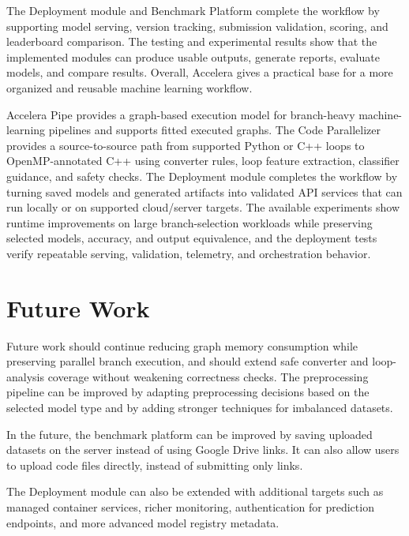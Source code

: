 \documentclass[12pt,a4paper]{report}
\begin{document}
\noindent The Deployment module and Benchmark Platform complete the workflow by
supporting model serving, version tracking, submission validation, scoring, and
leaderboard comparison. The testing and experimental results show that the
implemented modules can produce usable outputs, generate reports, evaluate
models, and compare results. Overall, Accelera gives a practical base for a
more organized and reusable machine learning workflow.

\noindent Accelera Pipe provides a graph-based execution model for branch-heavy
machine-learning pipelines and supports fitted executed graphs. The Code
Parallelizer provides a source-to-source path from supported Python or C++
loops to OpenMP-annotated C++ using converter rules, loop feature extraction,
classifier guidance, and safety checks. The Deployment module completes the
workflow by turning saved models and generated artifacts into validated API
services that can run locally or on supported cloud/server targets. The
available experiments show runtime improvements on large branch-selection
workloads while preserving selected models, accuracy, and output equivalence,
and the deployment tests verify repeatable serving, validation, telemetry, and
orchestration behavior.

\section{Future Work}
Future work should continue reducing graph memory consumption while preserving
parallel branch execution, and should extend safe converter and loop-analysis
coverage without weakening correctness checks. The preprocessing pipeline can
be improved by adapting preprocessing decisions based on the selected model
type and by adding stronger techniques for imbalanced datasets.

\noindent In the future, the benchmark platform can be improved by saving
uploaded datasets on the server instead of using Google Drive links. It can
also allow users to upload code files directly, instead of submitting only
links.

\noindent
The Deployment module can also be extended with additional targets such as
managed container services, richer monitoring, authentication for prediction
endpoints, and more advanced model registry metadata.
\end{document}
